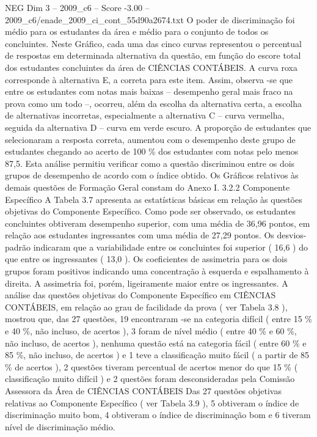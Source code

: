 \begin{textsample}{NEG Dim 3 – 2009\_c6 – Score -3.00 – 2009\_c6/enade\_2009\_ci\_cont\_55d90a2674.txt}
O poder de discriminação foi médio para os estudantes da área e médio para o conjunto de todos os concluintes.
Neste Gráfico, cada uma das cinco curvas representou o percentual de respostas em determinada alternativa da questão, em função do escore total dos estudantes concluintes da área de CIÊNCIAS CONTÁBEIS.
A curva roxa corresponde à alternativa E, a correta para este item.
Assim, observa -se que entre os estudantes com notas mais baixas – desempenho geral mais fraco na prova como um todo –, ocorreu, além da escolha da alternativa certa, a escolha de alternativas incorretas, especialmente a alternativa C – curva vermelha, seguida da alternativa D – curva em verde escuro.
A proporção de estudantes que selecionaram a resposta correta, aumentou com o desempenho deste grupo de estudantes chegando ao acerto de 100 \% dos estudantes com notas pelo menos 87,5.
Esta análise permitiu verificar como a questão discriminou entre os dois grupos de desempenho de acordo com o índice obtido.
Os Gráficos relativos às demais questões de Formação Geral constam do Anexo I. 3.2.2 Componente Específico A Tabela 3.7 apresenta as estatísticas básicas em relação às questões objetivas do Componente Específico.
Como pode ser observado, os estudantes concluintes obtiveram desempenho superior, com uma média de 36,96 pontos, em relação aos estudantes ingressantes com uma média de 27,29 pontos.
Os desvios-padrão indicaram que a variabilidade entre os concluintes foi superior ( 16,6 ) do que entre os ingressantes ( 13,0 ).
Os coeficientes de assimetria para os dois grupos foram positivos indicando uma concentração à esquerda e espalhamento à direita.
A assimetria foi, porém, ligeiramente maior entre os ingressantes.
A análise das questões objetivas do Componente Específico em CIÊNCIAS CONTÁBEIS, em relação ao grau de facilidade da prova ( ver Tabela 3.8 ), mostrou que, das 27 questões, 19 encontraram -se na categoria difícil ( entre 15 \% e 40 \%, não incluso, de acertos ), 3 foram de nível médio ( entre 40 \% e 60 \%, não incluso, de acertos ), nenhuma questão está na categoria fácil ( entre 60 \% e 85 \%, não incluso, de acertos ) e 1 teve a classificação muito fácil ( a partir de 85 \% de acertos ), 2 questões tiveram percentual de acertos menor do que 15 \% ( classificação muito difícil ) e 2 questões foram desconsideradas pela Comissão Assessora da Área de CIÊNCIAS CONTÁBEIS Das 27 questões objetivas relativas ao Componente Específico ( ver Tabela 3.9 ), 5 obtiveram o índice de discriminação muito bom, 4 obtiveram o índice de discriminação bom e 6 tiveram nível de discriminação médio.

\end{textsample}
